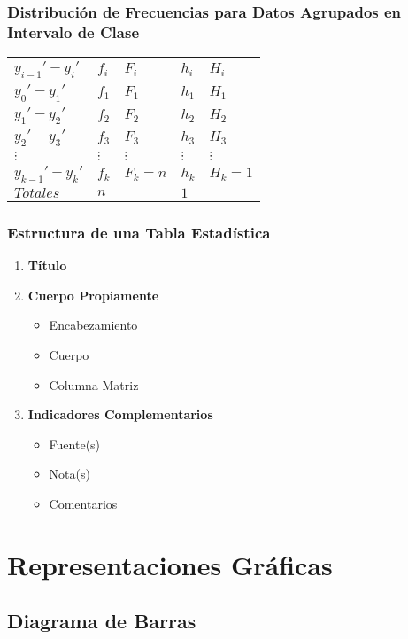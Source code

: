 \subsubsection{Distribución de Frecuencias para Datos Agrupados en Intervalo de Clase}
\begin{center}
\begin{tabular}{|C{1.5cm}|C{1.5cm}|C{1.5cm}|C{1.5cm}|C{1.5cm}|}
\hline
$y_{i-1}'-y_i'$ & $f_i$ & $F_i$ & $h_i$ & $H_i$\\ \hline
$y_0'-y_1'$ & $f_1$ & $F_1$ & $h_1$ & $H_1$\\ \hline
$y_1'-y_2'$ & $f_2$ & $F_2$ & $h_2$ & $H_2$\\ \hline
$y_2'-y_3'$ & $f_3$ & $F_3$ & $h_3$ & $H_3$\\ \hline
$\vdots$ & $\vdots$ & $\vdots$ & $\vdots$ & $\vdots$ \\ \hline
$y_{k-1}'-y_k'$ & $f_k$ & $F_k=n$ & $h_k$ & $H_k=1$ \\ \hline
$Totales$ & $n$ &  & $1$ & \\ 
\hline
\end{tabular}
\end{center}
\subsubsection{Estructura de una Tabla Estadística}
\begin{enumerate}
\item \textbf{Título}
\item \textbf{Cuerpo Propiamente }
\begin{itemize}
\item Encabezamiento
\item Cuerpo
\item Columna Matriz
\end{itemize}
\item \textbf{Indicadores Complementarios}
\begin{itemize}
\item Fuente(s)
\item Nota(s)
\item Comentarios
\end{itemize}
\end{enumerate}
\section{Representaciones Gráficas}
\subsection{Diagrama de Barras}
